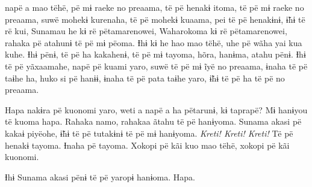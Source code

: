  napë a mao tëhë, pë mɨ raeke no preaama, të pë henakɨ itoma, të pë
mɨ raeke no preaama, suwë mohekɨ kurenaha, të pë mohekɨ kuaama, pei të
pë henakɨnɨ, ɨ̃hɨ të rë kui, Sunamau he kɨ rë pëtamarenowei, Waharokoma
kɨ rë pëtamarenowei, rahaka pë atahunɨ të pë mɨ pëoma. Ɨhɨ kɨ he hao mao
tëhë, uhe pë wãha yai kua kuhe. Ɨhɨ pënɨ, të pë ha kakahenɨ, të pë
mɨ tayoma, hõra, hanɨma, atahu pënɨ. Ɨhɨ të pë yãxaamahe, napë pë kuami
yaro, suwë të pë mɨ ĩyë no preaama, ɨnaha të pë taɨhe ha, huko si pë
hanɨɨ, ɨnaha të pë pata taɨhe yaro, ɨ̃hɨ të pë ha të pë no preaama. 

Hapa nakɨra pë kuonomi yaro, weti a napë a ha pëtarunɨ, kɨ taprapë?
Mɨ hanɨyou të kuoma hapa. Rahaka namo, rahakaa ãtahu të pë hanɨyoma.
Sunama akasi pë kakaɨ piyëohe, ɨ̃hɨ të pë tutakɨnɨ të pë mɨ hanɨyoma.
\textit{Kreti! Kreti! Kreti!} Të pë henakɨ tayoma. Ɨnaha pë tayoma. Xokopi pë kãi
kuo mao tëhë, xokopi pë kãi kuonomi. 

Ɨhɨ Sunama akasi pënɨ të pë yaropɨ hanɨoma. Hapa. 
